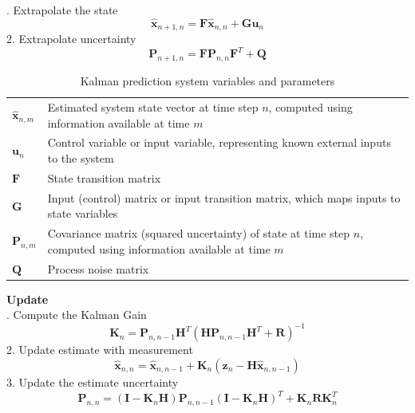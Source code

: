\documentclass{article}
\begin{document}
. Extrapolate the state
\begin{equation*}
    \mathbf{\hat{x}}_{n+1,n} = \mathbf{F} \mathbf{\hat{x}}_{n,n} + \mathbf{G} \mathbf{u}_n
\end{equation*}
2. Extrapolate uncertainty
\begin{equation*}
    \mathbf{P}_{n+1,n} = \mathbf{F}\mathbf{P}_{n,n} \mathbf{F}^T + \mathbf{Q}
\end{equation*}

\begin{table}[H]
    \centering
    \renewcommand{\arraystretch}{1.2}
    \begin{tabular}{lp{8cm}}
        \toprule
        \midrule
        $\mathbf{\hat{x}}_{n,m}$ & Estimated system state vector at time step $n$, computed using information available at time $m$ \\
        $\mathbf{u}_n$ & Control variable or input variable, representing known external inputs to the system \\
        $\mathbf{F}$ & State transition matrix \\
        $\mathbf{G}$ & Input (control) matrix or input transition matrix, which maps inputs to state variables \\
        $\mathbf{P}_{n,m}$ & Covariance matrix (squared uncertainty) of state at time step $n$, computed using information available at time $m$ \\
        $\mathbf{Q}$ & Process noise matrix \\
        \bottomrule
    \end{tabular}
    \caption{Kalman prediction system variables and parameters}
\end{table}

\noindent \textbf{Update} \\

. Compute the Kalman Gain
\begin{equation*}
    \mathbf{K}_n = \mathbf{P}_{n,n-1} \mathbf{H}^T \left(\mathbf{H}\mathbf{P}_{n,n-1}\mathbf{H}^T + \mathbf{R}\right)^{-1}
\end{equation*}
2. Update estimate with measurement
\begin{equation*}
    \mathbf{\hat{x}}_{n,n} = \mathbf{\hat{x}}_{n,n-1} + \mathbf{K}_n (\mathbf{z}_n - \mathbf{H}\mathbf{\hat{x}}_{n,n-1})
\end{equation*}
3. Update the estimate uncertainty
\begin{equation*}
    \mathbf{P}_{n,n} = (\mathbf{I} - \mathbf{K}_n \mathbf{H}) \mathbf{P}_{n,n-1} (\mathbf{I} - \mathbf{K}_n \mathbf{H})^T + \mathbf{K}_n \mathbf{R} \mathbf{K}_n^T
\end{equation*}
\end{document}
